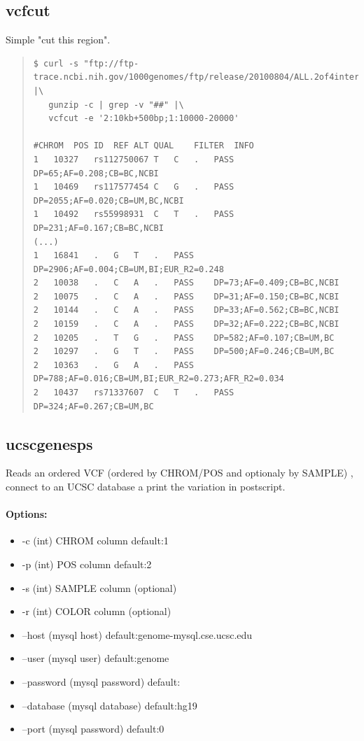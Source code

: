 \documentclass[12pt]{article}
\begin{document}
\subsection{vcfcut}
Simple "cut this region".
\begin{quote}
\begin{verbatim}
$ curl -s "ftp://ftp-trace.ncbi.nih.gov/1000genomes/ftp/release/20100804/ALL.2of4intersection.20100804.sites.vcf.gz" |\
   gunzip -c | grep -v "##" |\
   vcfcut -e '2:10kb+500bp;1:10000-20000'
   
#CHROM	POS	ID	REF	ALT	QUAL	FILTER	INFO
1	10327	rs112750067	T	C	.	PASS	DP=65;AF=0.208;CB=BC,NCBI
1	10469	rs117577454	C	G	.	PASS	DP=2055;AF=0.020;CB=UM,BC,NCBI
1	10492	rs55998931	C	T	.	PASS	DP=231;AF=0.167;CB=BC,NCBI
(...)
1	16841	.	G	T	.	PASS	DP=2906;AF=0.004;CB=UM,BI;EUR_R2=0.248
2	10038	.	C	A	.	PASS	DP=73;AF=0.409;CB=BC,NCBI
2	10075	.	C	A	.	PASS	DP=31;AF=0.150;CB=BC,NCBI
2	10144	.	C	A	.	PASS	DP=33;AF=0.562;CB=BC,NCBI
2	10159	.	C	A	.	PASS	DP=32;AF=0.222;CB=BC,NCBI
2	10205	.	T	G	.	PASS	DP=582;AF=0.107;CB=UM,BC
2	10297	.	G	T	.	PASS	DP=500;AF=0.246;CB=UM,BC
2	10363	.	G	A	.	PASS	DP=788;AF=0.016;CB=UM,BI;EUR_R2=0.273;AFR_R2=0.034
2	10437	rs71337607	C	T	.	PASS	DP=324;AF=0.267;CB=UM,BC
\end{verbatim}
\end{quote}

\subsection{ucscgenesps}
Reads an ordered VCF (ordered by CHROM/POS and optionaly by SAMPLE) , connect to an UCSC database a print the
variation in postscript.
\paragraph{Options:}
\begin{itemize}
\item-c (int) CHROM column default:1
\item-p (int) POS column default:2
\item-s (int) SAMPLE column (optional) 
\item-r (int) COLOR column (optional)
\item--host (mysql host) default:genome-mysql.cse.ucsc.edu
\item--user (mysql user) default:genome
\item--password (mysql password) default:
\item--database (mysql database) default:hg19
\item--port (mysql password) default:0
\end{itemize}
\end{document}

